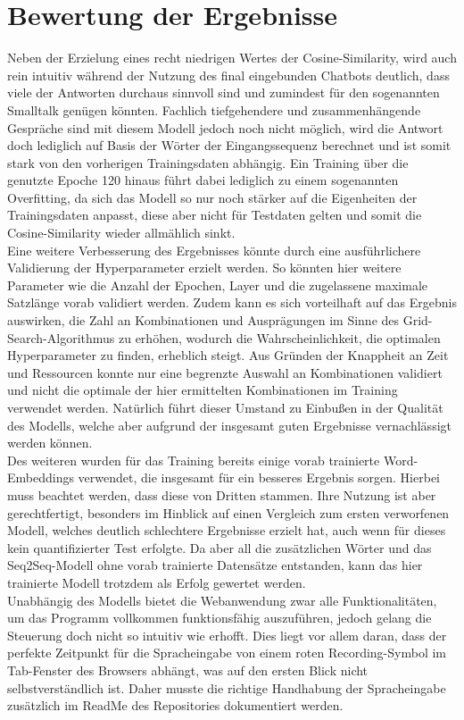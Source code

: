 \documentclass{aa}
\begin{document}
\section{Bewertung der Ergebnisse}
    Neben der Erzielung eines recht niedrigen Wertes der Cosine-Similarity, wird auch rein intuitiv während der Nutzung des final eingebunden Chatbots deutlich, dass viele der Antworten durchaus sinnvoll sind und zumindest für den sogenannten Smalltalk genügen könnten. Fachlich tiefgehendere und zusammenhängende Gespräche sind mit diesem Modell jedoch noch nicht möglich, wird die Antwort doch lediglich auf Basis der Wörter der Eingangssequenz berechnet und ist somit stark von den vorherigen Trainingsdaten abhängig. Ein Training über die genutzte Epoche 120 hinaus führt dabei lediglich zu einem sogenannten Overfitting, da sich das Modell so nur noch stärker auf die Eigenheiten der Trainingsdaten anpasst, diese aber nicht für Testdaten gelten und somit die Cosine-Similarity wieder allmählich sinkt.\\
    Eine weitere Verbesserung des Ergebnisses könnte durch eine ausführlichere Validierung der Hyperparameter erzielt werden. So könnten hier weitere Parameter wie die Anzahl der Epochen, Layer und die zugelassene maximale Satzlänge vorab validiert werden. Zudem kann es sich vorteilhaft auf das Ergebnis  auswirken, die Zahl an Kombinationen und Ausprägungen im Sinne des Grid-Search-Algorithmus zu erhöhen, wodurch die Wahrscheinlichkeit, die optimalen Hyperparameter zu finden, erheblich steigt. Aus Gründen der Knappheit an Zeit und Ressourcen konnte nur eine begrenzte Auswahl an Kombinationen validiert und nicht die optimale der hier ermittelten Kombinationen im Training verwendet werden. Natürlich führt dieser Umstand zu Einbußen in der Qualität des Modells, welche aber aufgrund der insgesamt guten Ergebnisse vernachlässigt werden können.\\
    Des weiteren wurden für das Training bereits einige vorab trainierte Word-Embeddings verwendet, die insgesamt für ein besseres Ergebnis sorgen. Hierbei muss beachtet werden, dass diese von Dritten stammen. Ihre Nutzung ist aber gerechtfertigt, besonders im Hinblick auf einen Vergleich zum ersten verworfenen Modell, welches deutlich schlechtere Ergebnisse erzielt hat, auch wenn für dieses kein quantifizierter Test erfolgte. Da aber all die zusätzlichen Wörter und das Seq2Seq-Modell ohne vorab trainierte Datensätze entstanden, kann das hier trainierte Modell trotzdem als Erfolg gewertet werden.\\
    Unabhängig des Modells bietet die Webanwendung zwar alle Funktionalitäten, um das Programm vollkommen funktionsfähig auszuführen, jedoch gelang die Steuerung doch nicht so intuitiv wie erhofft. Dies liegt vor allem daran, dass der perfekte Zeitpunkt für die Spracheingabe von einem roten Recording-Symbol im Tab-Fenster des Browsers abhängt, was auf den ersten Blick nicht selbstverständlich ist. Daher musste die richtige Handhabung der Spracheingabe zusätzlich im ReadMe des Repositories dokumentiert werden.
    
\end{document}
